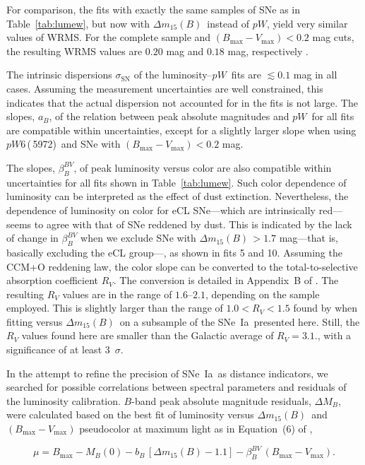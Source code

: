 \documentclass[apj]{emulateapj-rtx4}
\newcommand{\ew}{$pW$}
\newcommand{\pwsix}{$pW$6\,(\ion{Si}{2}\,5972)}
\newcommand{\dm}{$\Delta m_{15}(B)$}
\newcommand{\sneia}{SNe~Ia}
\begin{document}
For comparison, the fits with exactly the same
samples of SNe as in Table~\ref{tab:lumew}, but now with
\dm\ instead of \ew, yield very similar values of WRMS. For
the complete sample and $(B_{\mathrm{max}}-V_{\mathrm{max}})<0.2$ mag
cuts, the resulting WRMS values are $0.20$ mag and $0.18$
mag, respectively \citep[see also Table~8 of][]{folatelli10}. 

The intrinsic dispersions $\sigma_{\mathrm{SN}}$ of the
luminosity--\ew\ fits are $\lesssim$$0.1$ mag in all
cases. Assuming the measurement uncertainties 
are well constrained, this indicates that the actual dispersion not
accounted for in the fits is not large. The slopes, $a_B$, of the
relation between peak absolute magnitudes and \ew\ for all fits are
compatible within uncertainties, except for a slightly larger
slope when using \pwsix\ and SNe with
$(B_{\mathrm{max}}-V_{\mathrm{max}})<0.2$ mag.

The slopes, $\beta_B^{BV}$, of peak luminosity versus color are also
compatible within uncertainties for all fits shown in
Table~\ref{tab:lumew}. Such color dependence of luminosity can be
interpreted as the effect of dust extinction. Nevertheless, the
dependence of luminosity on color for eCL SNe---which are
intrinsically red---seems to agree with that of SNe reddened by
dust. This is indicated by the lack of change in $\beta_B^{BV}$ when
we exclude SNe with \dm\,$>1.7$ mag---that is, basically excluding the
eCL group---, as shown in fits 5 and 10. Assuming the CCM+O reddening
law, the color slope can be converted to the total-to-selective
absorption coefficient $R_V$. The conversion is detailed in Appendix~B of
\citet{folatelli10}. The resulting $R_V$ values are in the range of
$1.6$--$2.1$, depending on the sample employed. This is
slightly larger than the range of $1.0 < R_V < 1.5$ found by
\citet{folatelli10} when fitting versus \dm\ on a subsample of the
\sneia\ presented here. Still, the $R_V$ values found here are smaller
than the Galactic average of $R_V=3.1$., with a significance of at
least 3~$\sigma$.

In the attempt to refine the precision of \sneia\ as distance
indicators, we searched for possible correlations between spectral 
parameters and residuals of the luminosity calibration. 
$B$-band peak absolute magnitude residuals, $\Delta M_B$, were
calculated based on the best fit of luminosity versus \dm\ and
$(B_{\mathrm{max}}-V_{\mathrm{max}})$ pseudocolor at maximum light as
in Equation~(6) of \citet{folatelli10}, 

{\small 
\begin{equation}
\label{eq:modtbor}
\mu=B_{\mathrm{max}}-M_B(0)-b_B\,\left[\Delta m_{15}(B)-1.1\right]-\beta_B^{BV}\,(B_{\mathrm{max}}-V_{\mathrm{max}}).
\end{equation}
}
\end{document}
